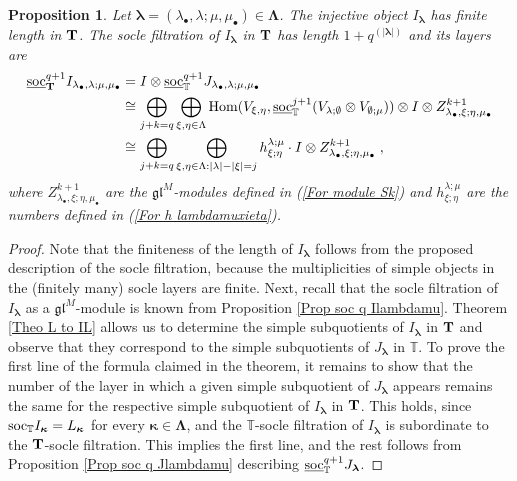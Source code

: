 \documentclass[12pt]{article}
\def\TT {{\mathbb T}}     %
\def\mk {\mathfrak}
\def\ul  {\underline}
\newtheorem{prop}[theorem]{Proposition}
\begin{document}
\begin{prop}\label{Prop ITsoc Ilambdamu}
Let $\bm\lambda=(\lambda_\bullet,\lambda;\mu,\mu_\bullet)\in \bm\Lambda$. The injective object $I_{\bm\lambda}$ has finite length in ${\bf T}$. The socle filtration of $I_{\bm\lambda}$ in ${\bf T}$ has length $1+q^{(|\bm\lambda|)}$ and its layers are
\begin{align*}
\ul{\rm soc}_{{\bf T}}^{q+1}I_{\lambda_\bullet,\lambda;\mu,\mu_\bullet} & = I\otimes \ul{\rm soc}_{\TT}^{q+1}J_{\lambda_\bullet,\lambda;\mu,\mu_\bullet}\\
& \cong \bigoplus\limits_{j+k=q} \bigoplus\limits_{\xi,\eta\in\Lambda} {\rm Hom}(V_{\xi,\eta},\ul{\rm soc}_{\TT}^{j+1}(V_{\lambda;\emptyset}\otimes V_{\emptyset;\mu}))\otimes I\otimes Z^{k+1}_{\lambda_\bullet,\xi;\eta,\mu_\bullet}\\
& \cong \bigoplus\limits_{j+k=q} \bigoplus\limits_{\xi,\eta\in\Lambda:|\lambda|-|\xi|=j} h^{\lambda;\mu}_{\xi;\eta} \cdot I\otimes Z^{k+1}_{\lambda_\bullet,\xi;\eta,\mu_\bullet} \;,
\end{align*}
where $Z^{k+1}_{\lambda_\bullet,\xi;\eta,\mu_\bullet}$ are the $\mk{gl}^M$-modules defined in (\ref{For module Sk}) and $h^{\lambda;\mu}_{\xi;\eta}$ are the numbers defined in (\ref{For h lambdamuxieta}).
\end{prop}

\begin{proof}
Note that the finiteness of the length of $I_{\bm\lambda}$ follows from the proposed description of the socle filtration, because the multiplicities of simple objects in the (finitely many) socle layers are finite. Next, recall that the socle filtration of $I_{\bm\lambda}$ as a $\mk{gl}^M$-module is known from Proposition \ref{Prop soc q Ilambdamu}. Theorem \ref{Theo L to IL} allows us to determine the simple subquotients of $I_{\bm\lambda}$ in ${\bf T}$ and observe that they correspond to the simple subquotients of $J_{\bm\lambda}$ in $\TT$. To prove the first line of the formula claimed in the theorem, it remains to show that the number of the layer in which a given simple subquotient of $J_{\bm\lambda}$ appears remains the same for the respective simple subquotient of $I_{\bm\lambda}$ in ${\bf T}$. This holds, since ${\rm soc}_\TT I_{\bm\kappa} = L_{\bm\kappa}$ for every $\bm\kappa\in\bm\Lambda$, and the $\TT$-socle filtration of $I_{\bm\lambda}$ is subordinate to the ${\bf T}$-socle filtration. This implies the first line, and the rest follows from Proposition \ref{Prop soc q Jlambdamu} describing $\ul{\rm soc}_{\TT}^{q+1}J_{\bm\lambda}$.
\end{proof}
\end{document}
